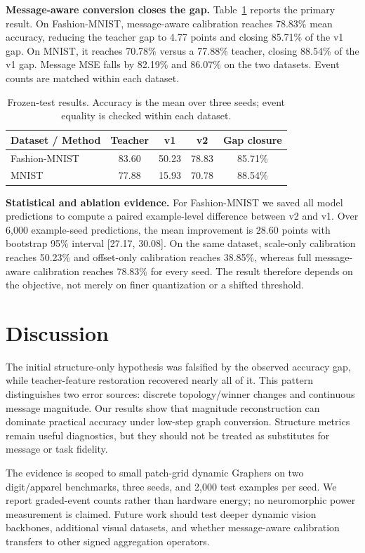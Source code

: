 \documentclass[10pt,twocolumn]{article}
\begin{document}
\textbf{Message-aware conversion closes the gap.} Table~\ref{tab:main} reports the primary result. On Fashion-MNIST, message-aware calibration reaches 78.83\% mean accuracy, reducing the teacher gap to 4.77 points and closing 85.71\% of the v1 gap. On MNIST, it reaches 70.78\% versus a 77.88\% teacher, closing 88.54\% of the v1 gap. Message MSE falls by 82.19\% and 86.07\% on the two datasets. Event counts are matched within each dataset.

\begin{table}[t]
\centering
\caption{Frozen-test results. Accuracy is the mean over three seeds; event equality is checked within each dataset.}
\label{tab:main}
\begin{tabular}{lcccc}
\toprule
Dataset / Method & Teacher & v1 & v2 & Gap closure \\
\midrule
Fashion-MNIST & 83.60 & 50.23 & 78.83 & 85.71\% \\
MNIST & 77.88 & 15.93 & 70.78 & 88.54\% \\
\bottomrule
\end{tabular}
\end{table}

\textbf{Statistical and ablation evidence.} For Fashion-MNIST we saved all model predictions to compute a paired example-level difference between v2 and v1. Over 6,000 example-seed predictions, the mean improvement is 28.60 points with bootstrap 95\% interval [27.17, 30.08]. On the same dataset, scale-only calibration reaches 50.23\% and offset-only calibration reaches 38.85\%, whereas full message-aware calibration reaches 78.83\% for every seed. The result therefore depends on the objective, not merely on finer quantization or a shifted threshold.

\section{Discussion}
The initial structure-only hypothesis was falsified by the observed accuracy gap, while teacher-feature restoration recovered nearly all of it. This pattern distinguishes two error sources: discrete topology/winner changes and continuous message magnitude. Our results show that magnitude reconstruction can dominate practical accuracy under low-step graph conversion. Structure metrics remain useful diagnostics, but they should not be treated as substitutes for message or task fidelity.

The evidence is scoped to small patch-grid dynamic Graphers on two digit/apparel benchmarks, three seeds, and 2,000 test examples per seed. We report graded-event counts rather than hardware energy; no neuromorphic power measurement is claimed. Future work should test deeper dynamic vision backbones, additional visual datasets, and whether message-aware calibration transfers to other signed aggregation operators.
\end{document}
